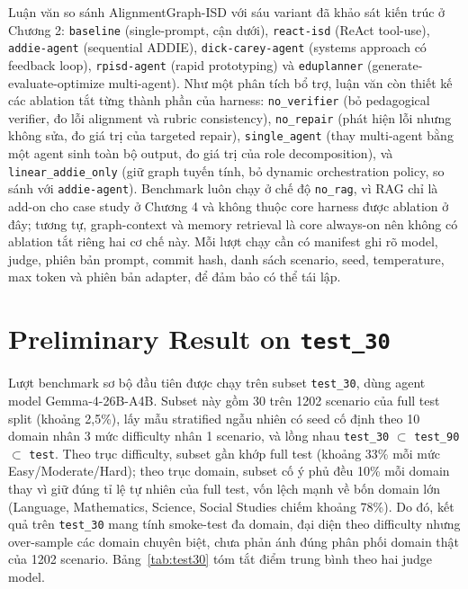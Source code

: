 \documentclass[../main.tex]{subfiles}
\begin{document}
Luận văn so sánh AlignmentGraph-ISD với sáu variant đã khảo sát kiến trúc ở Chương 2: \texttt{baseline} (single-prompt, cận dưới), \texttt{react-isd} (ReAct tool-use), \texttt{addie-agent} (sequential ADDIE), \texttt{dick-carey-agent} (systems approach có feedback loop), \texttt{rpisd-agent} (rapid prototyping) và \texttt{eduplanner} (generate-evaluate-optimize multi-agent). Như một phân tích bổ trợ, luận văn còn thiết kế các ablation tắt từng thành phần của harness: \texttt{no\_verifier} (bỏ pedagogical verifier, đo lỗi alignment và rubric consistency), \texttt{no\_repair} (phát hiện lỗi nhưng không sửa, đo giá trị của targeted repair), \texttt{single\_agent} (thay multi-agent bằng một agent sinh toàn bộ output, đo giá trị của role decomposition), và \texttt{linear\_addie\_only} (giữ graph tuyến tính, bỏ dynamic orchestration policy, so sánh với \texttt{addie-agent}). Benchmark luôn chạy ở chế độ \texttt{no\_rag}, vì RAG chỉ là add-on cho case study ở Chương 4 và không thuộc core harness được ablation ở đây; tương tự, graph-context và memory retrieval là core always-on nên không có ablation tắt riêng hai cơ chế này. Mỗi lượt chạy cần có manifest ghi rõ model, judge, phiên bản prompt, commit hash, danh sách scenario, seed, temperature, max token và phiên bản adapter, để đảm bảo có thể tái lập.

\section{Preliminary Result on \texttt{test\_30}}

Lượt benchmark sơ bộ đầu tiên được chạy trên subset \texttt{test\_30}, dùng agent model Gemma-4-26B-A4B. Subset này gồm 30 trên 1202 scenario của full test split (khoảng 2,5\%), lấy mẫu stratified ngẫu nhiên có seed cố định theo 10 domain nhân 3 mức difficulty nhân 1 scenario, và lồng nhau \texttt{test\_30} $\subset$ \texttt{test\_90} $\subset$ \texttt{test}. Theo trục difficulty, subset gần khớp full test (khoảng 33\% mỗi mức Easy/Moderate/Hard); theo trục domain, subset cố ý phủ đều 10\% mỗi domain thay vì giữ đúng tỉ lệ tự nhiên của full test, vốn lệch mạnh về bốn domain lớn (Language, Mathematics, Science, Social Studies chiếm khoảng 78\%). Do đó, kết quả trên \texttt{test\_30} mang tính smoke-test đa domain, đại diện theo difficulty nhưng over-sample các domain chuyên biệt, chưa phản ánh đúng phân phối domain thật của 1202 scenario. Bảng~\ref{tab:test30} tóm tắt điểm trung bình theo hai judge model.
\end{document}
